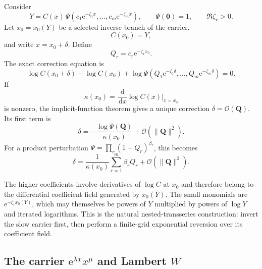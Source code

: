 \documentclass[11pt,oneside]{article}
\numberwithin{equation}{section}
\theoremstyle{plain}
\theoremstyle{definition}
\theoremstyle{remark}
\newcommand{\e}{\mathrm e}
\newcommand{\dd}{\,\mathrm d}
\newcommand{\Ord}{\mathcal O}
\newcommand{\multi}[1]{\bm{#1}}
\begin{document}
Consider
\begin{equation}\label{eq:carrier-Psi}
 Y=C(x)\,
 \Psi\!\left(c_1\e^{-\zeta_1x},\ldots,
             c_m\e^{-\zeta_mx}\right),
 \qquad \Psi(\multi0)=1,
 \qquad \Re\zeta_r>0.
\end{equation}
Let \(x_0=x_0(Y)\) be a selected inverse branch of the carrier,
\begin{equation}\label{eq:x0-carrier}
 C(x_0)=Y,
\end{equation}
and write \(x=x_0+\delta\).  Define
\begin{equation}\label{eq:carrier-Q}
 Q_r=c_r\e^{-\zeta_rx_0}.
\end{equation}
The exact correction equation is
\begin{equation}\label{eq:carrier-correction-exact}
 \log C(x_0+\delta)-\log C(x_0)
 +\log\Psi\!\left(Q_1\e^{-\zeta_1\delta},\ldots,
                  Q_m\e^{-\zeta_m\delta}\right)=0.
\end{equation}
If
\begin{equation}\label{eq:kappa-def}
 \kappa(x_0)=\frac{\dd}{\dd x}\log C(x)\bigg|_{x=x_0}
\end{equation}
is nonzero, the implicit-function theorem gives a unique correction
\(\delta=\Ord(\multi Q)\).  Its first term is
\begin{equation}\label{eq:carrier-first-correction}
 \delta=-\frac{\log\Psi(\multi Q)}{\kappa(x_0)}
 +\Ord(\|\multi Q\|^2).
\end{equation}
For a product perturbation
\(
 \Psi=\prod_r(1-Q_r)^{\beta_r}
\), this becomes
\begin{equation}\label{eq:carrier-first-product}
 \delta=\frac1{\kappa(x_0)}
 \sum_{r=1}^m\beta_rQ_r+\Ord(\|\multi Q\|^2).
\end{equation}

The higher coefficients involve derivatives of \(\log C\) at \(x_0\) and
therefore belong to the differential coefficient field generated by
\(x_0(Y)\).  The small monomials are
\(
 \e^{-\zeta_rx_0(Y)}
\), which may themselves be powers of \(Y\) multiplied by powers of
\(\log Y\) and iterated logarithms.  This is the natural nested-transseries
construction: invert the slow carrier first, then perform a finite-grid
exponential reversion over its coefficient field.

\subsection{The carrier \texorpdfstring{\(\e^{\lambda x}x^\mu\)}{exp(lambda x) times x to the mu} and Lambert \texorpdfstring{\(W\)}{W}}
\end{document}
